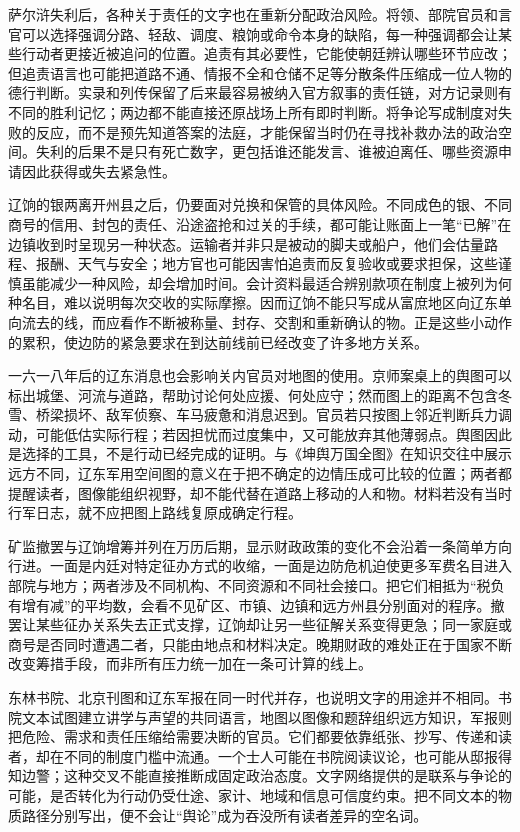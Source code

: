 萨尔浒失利后，各种关于责任的文字也在重新分配政治风险。将领、部院官员和言官可以选择强调分路、轻敌、调度、粮饷或命令本身的缺陷，每一种强调都会让某些行动者更接近被追问的位置。追责有其必要性，它能使朝廷辨认哪些环节应改；但追责语言也可能把道路不通、情报不全和仓储不足等分散条件压缩成一位人物的德行判断。实录和列传保留了后来最容易被纳入官方叙事的责任链，对方记录则有不同的胜利记忆；两边都不能直接还原战场上所有即时判断。将争论写成制度对失败的反应，而不是预先知道答案的法庭，才能保留当时仍在寻找补救办法的政治空间。失利的后果不是只有死亡数字，更包括谁还能发言、谁被迫离任、哪些资源申请因此获得或失去紧急性。

辽饷的银两离开州县之后，仍要面对兑换和保管的具体风险。不同成色的银、不同商号的信用、封包的责任、沿途盗抢和过关的手续，都可能让账面上一笔“已解”在边镇收到时呈现另一种状态。运输者并非只是被动的脚夫或船户，他们会估量路程、报酬、天气与安全；地方官也可能因害怕追责而反复验收或要求担保，这些谨慎虽能减少一种风险，却会增加时间。会计资料最适合辨别款项在制度上被列为何种名目，难以说明每次交收的实际摩擦。因而辽饷不能只写成从富庶地区向辽东单向流去的线，而应看作不断被称量、封存、交割和重新确认的物。正是这些小动作的累积，使边防的紧急要求在到达前线前已经改变了许多地方关系。

一六一八年后的辽东消息也会影响关内官员对地图的使用。京师案桌上的舆图可以标出城堡、河流与道路，帮助讨论何处应援、何处应守；然而图上的距离不包含冬雪、桥梁损坏、敌军侦察、车马疲惫和消息迟到。官员若只按图上邻近判断兵力调动，可能低估实际行程；若因担忧而过度集中，又可能放弃其他薄弱点。舆图因此是选择的工具，不是行动已经完成的证明。与《坤舆万国全图》在知识交往中展示远方不同，辽东军用空间图的意义在于把不确定的边情压成可比较的位置；两者都提醒读者，图像能组织视野，却不能代替在道路上移动的人和物。材料若没有当时行军日志，就不应把图上路线复原成确定行程。

矿监撤罢与辽饷增筹并列在万历后期，显示财政政策的变化不会沿着一条简单方向行进。一面是内廷对特定征办方式的收缩，一面是边防危机迫使更多军费名目进入部院与地方；两者涉及不同机构、不同资源和不同社会接口。把它们相抵为“税负有增有减”的平均数，会看不见矿区、市镇、边镇和远方州县分别面对的程序。撤罢让某些征办关系失去正式支撑，辽饷却让另一些征解关系变得更急；同一家庭或商号是否同时遭遇二者，只能由地点和材料决定。晚期财政的难处正在于国家不断改变筹措手段，而非所有压力统一加在一条可计算的线上。

东林书院、北京刊图和辽东军报在同一时代并存，也说明文字的用途并不相同。书院文本试图建立讲学与声望的共同语言，地图以图像和题辞组织远方知识，军报则把危险、需求和责任压缩给需要决断的官员。它们都要依靠纸张、抄写、传递和读者，却在不同的制度门槛中流通。一个士人可能在书院阅读议论，也可能从邸报得知边警；这种交叉不能直接推断成固定政治态度。文字网络提供的是联系与争论的可能，是否转化为行动仍受仕途、家计、地域和信息可信度约束。把不同文本的物质路径分别写出，便不会让“舆论”成为吞没所有读者差异的空名词。

